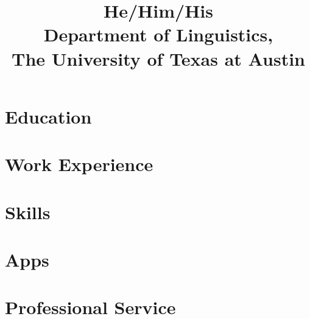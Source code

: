 \documentclass[11pt,a4paper]{mycv}
\title{He/Him/His\\Department of Linguistics,\\The University of Texas at Austin}
\begin{document}
\makecvtitle

\section{Education}


\section{Work Experience}


\begingroup
\setlength\bibitemsep{0.5ex}
\printbibliography[title=Select papers, nottype=unpublished]
\endgroup

\section{Skills}


\section{Apps}


\section{Professional Service}


% 
% 
% 
\end{document}
